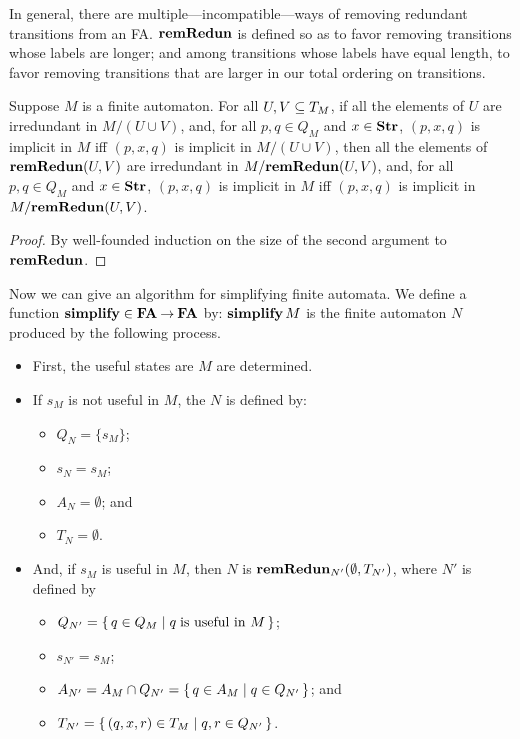 In general, there are multiple---incompatible---ways of removing
redundant transitions from an FA.  $\mathbf{remRedun}$ is defined so as to
favor removing transitions whose labels are longer; and
among transitions whose labels have equal length, to favor
removing transitions that are larger in our total ordering on
transitions.

\begin{proposition}
\label{RemRedunFA}
Suppose $M$ is a finite automaton.  For all $U,V\subseteq T_M$, if all the
elements of $U$ are irredundant in $M/(U\cup V)$, and, for all $p,q\in Q_M$
and $x\in\mathbf{Str}$, $(p,x,q)$ is implicit in $M$ iff $(p,x,q)$ is implicit
in $M/(U\cup V)$, then all the elements of $\mathbf{remRedun}(U,V)$ are
irredundant in $M/\mathbf{remRedun}(U,V)$, and, for all $p,q\in Q_M$ and
$x\in\mathbf{Str}$, $(p,x,q)$ is implicit in $M$ iff $(p,x,q)$ is implicit in
$M/\mathbf{remRedun}(U,V)$.
\end{proposition}

\begin{proof}
By well-founded induction on the size of the second argument to
$\mathbf{remRedun}$.
\end{proof}

Now we can give an algorithm for simplifying finite automata.
We define a function $\mathbf{simplify}\in\mathbf{FA}\mathbin{\to}\mathbf{FA}$ by: $\mathbf{simplify}\,M$ is
%
%
%
the finite automaton $N$ produced by the following process.
\begin{itemize}
\item First, the useful states are $M$ are determined.

\item If $s_M$ is not useful in $M$, the $N$ is defined by:
\begin{itemize}
\item $Q_N=\{s_M\}$;

\item $s_N = s_M$;

\item $A_N=\emptyset$; and

\item $T_N=\emptyset$.
\end{itemize}

\item And, if $s_M$ is useful in $M$, then $N$ is
$\mathbf{remRedun}_{N'}(\emptyset, T_{N'})$, where $N'$ is defined by
\begin{itemize}
\item $Q_{N'}=\{ \, q\in Q_M \mid q\;\allowbreak\mbox{is useful in $M$}\allowbreak \, \}$;

\item $s_{N'} = s_M$;

\item $A_{N'}=A_M\cap Q_{N'}=\{ \, q\in A_M \mid q\in Q_{N'} \, \}$; and

\item $T_{N'}=\{ \, (q, x, r)\in T_M \mid q,r\in Q_{N'} \, \}$.
\end{itemize}
\end{itemize}

